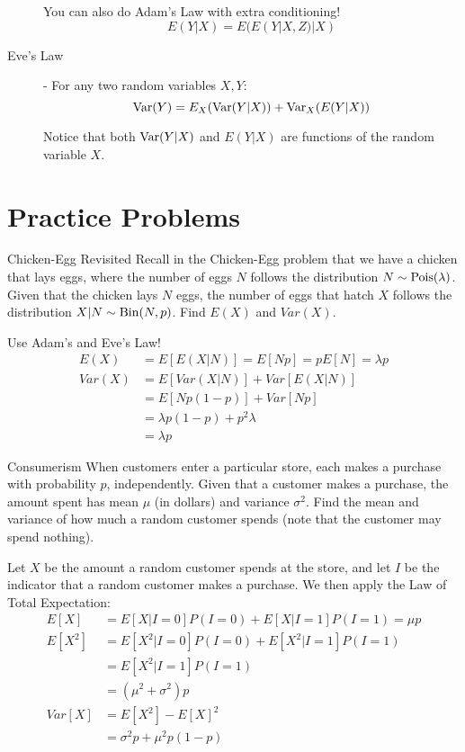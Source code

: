 \documentclass[11.5pt]{article}
\begin{document}
\begin{notes}
\begin{description}
You can also do Adam's Law with extra conditioning! 
    $$E(Y |X) = E(E(Y |X, Z)|X)$$   

\item[Eve's Law] - For any two random variables $X,Y$:
    $$ \textrm{Var}{(Y)} = E_X( \textrm{Var}{(Y | X)}) + \textrm{Var}_X{(E(Y | X))}$$

Notice that both $\textrm{Var}{(Y | X)}$ and $E(Y | X)$ are functions of the random variable $X$. 
\end{description}


\end{notes} 

\newpage
\section*{Practice Problems} 

\begin{exercise}{Chicken-Egg Revisited}
Recall in the Chicken-Egg problem that we have a chicken that lays eggs, where the number of eggs $N$ follows the distribution $N\sim \textrm{Pois}(\lambda)$. Given that the chicken lays $N$ eggs, the number of eggs that hatch $X$ follows the distribution $X|N \sim \textrm{Bin}(N,p)$. Find $E(X)$ and $Var(X)$.
\end{exercise}

\begin{solution}{2}
Use Adam's and Eve's Law!
\begin{align*}
    E(X) &= E[E(X|N)] = E[Np] = p E[N] =\lambda p\\
    Var(X) &= E[Var(X|N)] + Var[E(X|N)] \\
    &= E[Np(1-p)] + Var[Np] \\
    &= \lambda p(1-p) + p^2 \lambda \\
    &= \lambda p
\end{align*}
\end{solution}

\begin{exercise}{Consumerism}
When customers enter a particular store, each makes a purchase with probability $p$, independently. Given
that a customer makes a purchase, the amount spent has mean $\mu$ (in dollars) and
variance $\sigma^2$. Find the mean and variance of how much a random customer spends (note that the
customer may spend nothing). 
\end{exercise}
\begin{solution}{3}
Let $X$ be the amount a random customer spends at the store, and let $I$ be the indicator that a random customer makes a purchase. We then apply the Law of Total Expectation:
\begin{align*}
    E[X] &= E[X | I= 0]P(I=0) + E[X | I=1]P(I=1) = \mu p \\
    E[X^2] &= E[X^2 | I=0]P(I=0) + E[X^2 | I=1]P(I=1) \\
    &= E[X^2 | I=1]P(I=1) \\
    &= (\mu^2 + \sigma^2)p \\
    Var[X] &= E[X^2] - E[X]^2 \\
    &= \sigma^2 p +\mu^2 p (1-p)
\end{align*}
\end{solution}
\end{document}

